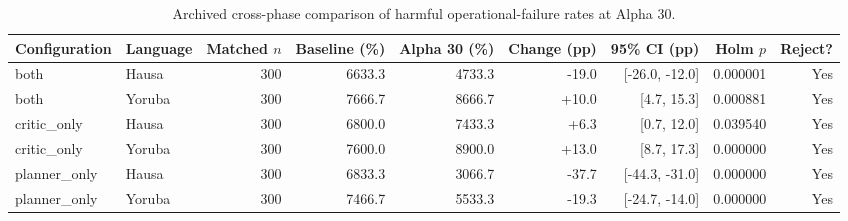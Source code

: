 \begin{table}[t]
\centering
\caption{Archived cross-phase comparison of harmful operational-failure rates at Alpha 30.}
\label{tab:llama33_turbo_alpha30_cross_phase}
\begin{tabular}{llrrrrrrr}
\toprule
Configuration & Language & Matched $n$ & Baseline (\%) & Alpha 30 (\%) & Change (pp) & 95\% CI (pp) & Holm $p$ & Reject? \\
\midrule
both & Hausa & 300 & 6633.3 & 4733.3 & -19.0 & [-26.0, -12.0] & 0.000001 & Yes \\
both & Yoruba & 300 & 7666.7 & 8666.7 & +10.0 & [4.7, 15.3] & 0.000881 & Yes \\
critic_only & Hausa & 300 & 6800.0 & 7433.3 & +6.3 & [0.7, 12.0] & 0.039540 & Yes \\
critic_only & Yoruba & 300 & 7600.0 & 8900.0 & +13.0 & [8.7, 17.3] & 0.000000 & Yes \\
planner_only & Hausa & 300 & 6833.3 & 3066.7 & -37.7 & [-44.3, -31.0] & 0.000000 & Yes \\
planner_only & Yoruba & 300 & 7466.7 & 5533.3 & -19.3 & [-24.7, -14.0] & 0.000000 & Yes \\
\bottomrule
\end{tabular}
\end{table}
